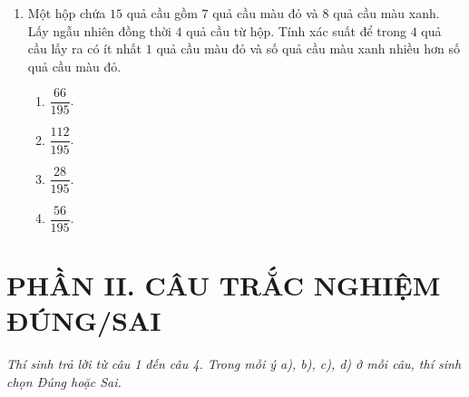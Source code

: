 \documentclass[12pt,a4paper]{article}
\begin{document}
\begin{enumerate}[label=\textbf{Câu \arabic*:}, leftmargin=*]
\item Một hộp chứa $15$ quả cầu gồm $7$ quả cầu màu đỏ và $8$ quả cầu màu xanh. Lấy ngẫu nhiên đồng thời $4$ quả cầu từ hộp. Tính xác suất để trong $4$ quả cầu lấy ra có ít nhất $1$ quả cầu màu đỏ và số quả cầu màu xanh nhiều hơn số quả cầu màu đỏ.
\begin{enumerate}[label=\Alph*.]
    \item $\dfrac{66}{195}$.
    \item $\dfrac{112}{195}$.
    \item $\dfrac{28}{195}$.
    \item $\dfrac{56}{195}$.
\end{enumerate}

\end{enumerate}

\section*{PHẦN II. CÂU TRẮC NGHIỆM ĐÚNG/SAI}
\textit{Thí sinh trả lời từ câu 1 đến câu 4. Trong mỗi ý a), b), c), d) ở mỗi câu, thí sinh chọn Đúng hoặc Sai.}
\end{document}
